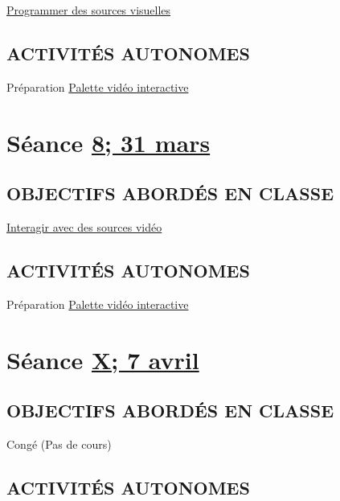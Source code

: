 \documentclass[
]{book}
\begin{document}
\protect\hyperlink{programmer}{Programmer des sources visuelles}

\hypertarget{activituxe9s-autonomes-7}{%
\subsection{ACTIVITÉS AUTONOMES}\label{activituxe9s-autonomes-7}}

Préparation \protect\hyperlink{sommatif_4}{Palette vidéo interactive}

\hypertarget{semaine_9}{%
\section{\texorpdfstring{Séance \protect\hyperlink{semaine_9}{8; 31 mars}}{Séance 8; 31 mars}}\label{semaine_9}}

\hypertarget{objectifs-aborduxe9s-en-classe-8}{%
\subsection{OBJECTIFS ABORDÉS EN CLASSE}\label{objectifs-aborduxe9s-en-classe-8}}

\protect\hyperlink{interagir}{Interagir avec des sources vidéo}

\hypertarget{activituxe9s-autonomes-8}{%
\subsection{ACTIVITÉS AUTONOMES}\label{activituxe9s-autonomes-8}}

Préparation \protect\hyperlink{sommatif_4}{Palette vidéo interactive}

\hypertarget{semaine_10}{%
\section{\texorpdfstring{Séance \protect\hyperlink{semaine_10}{X; 7 avril}}{Séance X; 7 avril}}\label{semaine_10}}

\hypertarget{objectifs-aborduxe9s-en-classe-9}{%
\subsection{OBJECTIFS ABORDÉS EN CLASSE}\label{objectifs-aborduxe9s-en-classe-9}}

Congé (Pas de cours)

\hypertarget{activituxe9s-autonomes-9}{%
\subsection{ACTIVITÉS AUTONOMES}\label{activituxe9s-autonomes-9}}
\end{document}
